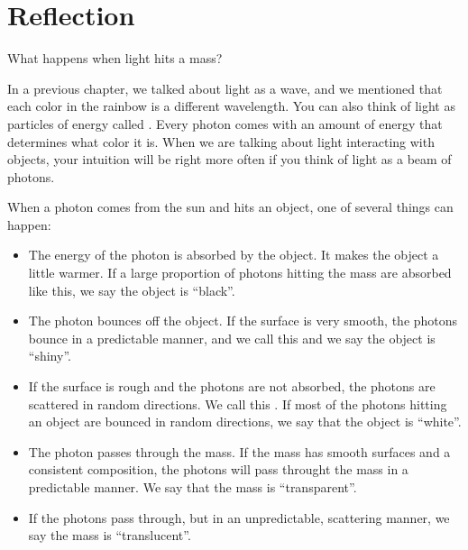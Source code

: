 \chapter{Reflection}

What happens when light hits a mass?

In a previous chapter, we talked about light as a wave, and we
mentioned that each color in the rainbow is a different
wavelength. You can also think of light as particles of energy called
. Every photon comes with an amount of energy
that determines what color it is.
When we are talking about light interacting with objects, your
intuition will be right more often if you think of light as a beam of
photons.

When a photon comes from the sun and hits an object, one of several
things can happen:

\begin{itemize}
  
  \item The energy of the photon is absorbed by the object. It makes the
    object a little warmer. If a large proportion of photons hitting the
    mass are absorbed like this, we say the object is ``black''.

 \item The photon bounces off the object. If the surface is very
   smooth, the photons bounce in a predictable manner, and we call
   this  and we say the object is ``shiny''.

 \item If the surface is rough and the photons are not absorbed, the
   photons are scattered in random directions. We call this
   . If most of the photons hitting an object are
   bounced in random directions, we say that the object is ``white''.

 \item The photon passes through the mass. If the mass has smooth
   surfaces and a consistent composition, the photons will pass throught the
   mass in a predictable manner. We say that the mass is ``transparent''.

 \item If the photons pass through, but in an unpredictable,
   scattering manner, we say the mass is ``translucent''. 

\end{itemize}

